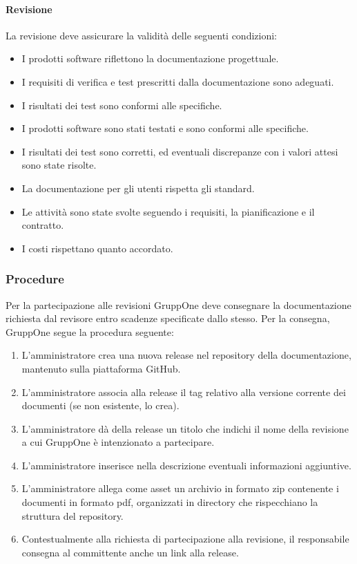 \documentclass[../../norme-di-progetto.tex]{subfiles}
\begin{document}
\paragraph{Revisione}%
\label{par:revisione/revisione}
La revisione deve assicurare la validità delle seguenti condizioni:

\begin{itemize}
  \item I prodotti software riflettono la documentazione progettuale.
  \item I requisiti di verifica e test prescritti dalla documentazione sono adeguati.
  \item I risultati dei test sono conformi alle specifiche.
  \item I prodotti software sono stati testati e sono conformi alle specifiche.
  \item I risultati dei test sono corretti, ed eventuali discrepanze con i valori attesi sono state risolte.
  \item La documentazione per gli utenti rispetta gli standard.
  \item Le attività sono state svolte seguendo i requisiti, la pianificazione e il contratto.
  \item I costi rispettano quanto accordato.
\end{itemize}


\subsubsection{Procedure}%
\label{subs:revisione/procedure}

Per la partecipazione alle revisioni GruppOne deve consegnare la documentazione richiesta dal revisore entro scadenze specificate dallo stesso. Per la consegna, GruppOne segue la procedura seguente:

\begin{enumerate}
  \item L'amministratore crea una nuova release nel repository della documentazione, mantenuto sulla piattaforma GitHub.
  \item L'amministratore associa alla release il tag relativo alla versione corrente dei documenti (se non esistente, lo crea).
  \item L'amministratore dà della release un titolo che indichi il nome della revisione a cui GruppOne è intenzionato a partecipare.
  \item L'amministratore inserisce nella descrizione eventuali informazioni aggiuntive.
  \item L'amministratore allega come asset un archivio in formato zip contenente i documenti in formato pdf, organizzati in directory che rispecchiano la struttura del repository.
  \item Contestualmente alla richiesta di partecipazione alla revisione, il responsabile consegna al committente anche un link alla release.
\end{enumerate}

\end{document}

